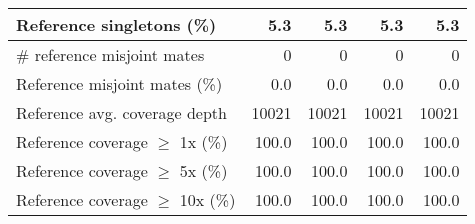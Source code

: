 \documentclass[12pt,a4paper]{article}
\begin{document}
\begin{table}[ht]
\begin{center}
\begin{tabular}{|l*{4}{|r}|}
Reference singletons (\%) & 5.3 & 5.3 & 5.3 & 5.3 \\ \hline
\# reference misjoint mates & 0 & 0 & 0 & 0 \\ \hline
Reference misjoint mates (\%) & 0.0 & 0.0 & 0.0 & 0.0 \\ \hline
Reference avg. coverage depth & 10021 & 10021 & 10021 & 10021 \\ \hline
Reference coverage $\geq$ 1x (\%) & 100.0 & 100.0 & 100.0 & 100.0 \\ \hline
Reference coverage $\geq$ 5x (\%) & 100.0 & 100.0 & 100.0 & 100.0 \\ \hline
Reference coverage $\geq$ 10x (\%) & 100.0 & 100.0 & 100.0 & 100.0 \\ \hline
\end{tabular}
\end{center}
\end{table}
\end{document}
